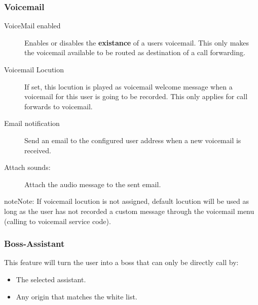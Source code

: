 \documentclass[letterpaper,10pt,english]{sphinxmanual}
\begin{document}
\subsubsection{Voicemail}
\label{administration_portal/client/vpbx/users:voicemail}\begin{description}
\item[{VoiceMail enabled}] \leavevmode{}\label{administration_portal/client/vpbx/users:term-voicemail-enabled}
Enables or disables the \textbf{existance} of a users voicemail.
This only makes the voicemail available to be routed as destination of a call forwarding.

\item[{Voicemail Locution}] \leavevmode{}\label{administration_portal/client/vpbx/users:term-voicemail-locution}
If set, this locution is played as voicemail welcome message when a voicemail
for this user is going to be recorded. This only applies for call forwards
to voicemail.

\item[{Email notification}] \leavevmode{}\label{administration_portal/client/vpbx/users:term-email-notification}
Send an email to the configured user address when a new voicemail is
received.

\item[{Attach sounds:}] \leavevmode{}\label{administration_portal/client/vpbx/users:term-attach-sounds}
Attach the audio message to the sent email.

\end{description}

\begin{notice}{note}{Note:}
If voicemail locution is not assigned, default locution will be used as long as
the user has not recorded a custom message through the voicemail menu (calling to
voicemail service code).
\end{notice}


\subsubsection{Boss-Assistant}
\label{administration_portal/client/vpbx/users:boss-assistant}
This feature will turn the user into a boss that can only be directly call by:
\begin{itemize}
\item {} 
The selected assistant.

\item {} 
Any origin that matches the white list.

\end{itemize}
\end{document}
